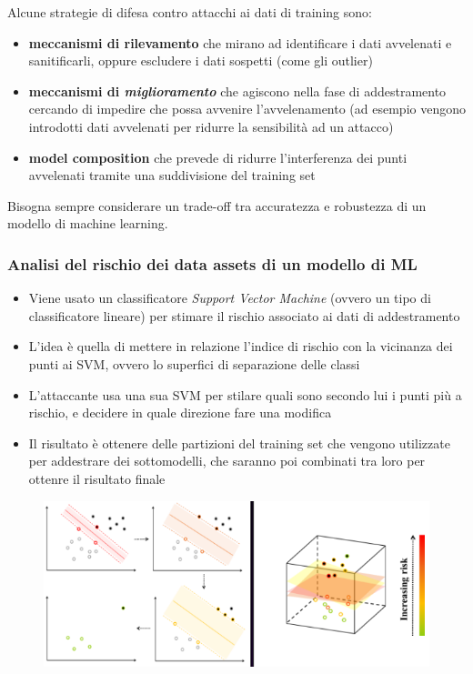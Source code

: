 \documentclass{report}
\begin{document}
\noindent Alcune strategie di difesa contro attacchi ai dati di training sono:
\begin{itemize}
    \item \textbf{meccanismi di rilevamento} che mirano ad identificare i dati avvelenati e sanitificarli, oppure escludere 
    i dati sospetti (come gli outlier)
    \item \textbf{meccanismi di \textit{miglioramento}} che agiscono nella fase di addestramento cercando di impedire che possa avvenire 
    l'avvelenamento (ad esempio vengono introdotti dati avvelenati per ridurre la sensibilità ad un attacco)
    \item \textbf{model composition} che prevede di ridurre l'interferenza dei punti avvelenati tramite una suddivisione del training set 
\end{itemize}

\noindent Bisogna sempre considerare un trade-off tra accuratezza e robustezza di un modello di machine learning.

\subsubsection{Analisi del rischio dei data assets di un modello di ML}

\begin{itemize}
    \item Viene usato un classificatore \textit{Support Vector Machine} (ovvero un tipo di classificatore lineare) per stimare il rischio associato ai dati di addestramento
    \item L'idea è quella di mettere in relazione l'indice di rischio con la vicinanza dei punti ai SVM, ovvero lo superfici di separazione 
    delle classi
    \item L'attaccante usa una sua SVM per stilare quali sono secondo lui i punti più a rischio, e decidere in quale direzione fare una modifica
    \item Il risultato è ottenere delle partizioni del training set che vengono utilizzate per addestrare dei sottomodelli, che saranno poi combinati tra 
    loro per ottenre il risultato finale
\end{itemize}

\begin{figure}[H]
    \centering
    \includegraphics[width=0.8\linewidth]{images/svm.png}
\end{figure}
\end{document}
